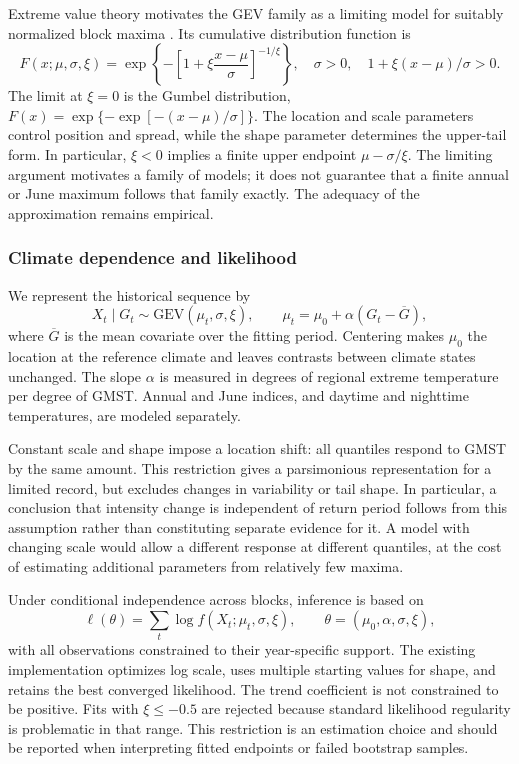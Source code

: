 \documentclass[11pt]{article}
\begin{document}
Extreme value theory motivates the GEV family as a limiting model for
suitably normalized block maxima
\cite{coles2001introduction,davison2015statistics}. Its
cumulative distribution function is
\begin{equation}
F(x;\mu,\sigma,\xi)=
\exp\left\{-\left[1+\xi\frac{x-\mu}{\sigma}\right]^{-1/\xi}\right\},
\quad \sigma>0,\quad 1+\xi(x-\mu)/\sigma>0.
\label{eq:gev}
\end{equation}
The limit at $\xi=0$ is the Gumbel distribution,
$F(x)=\exp\{-\exp[-(x-\mu)/\sigma]\}$. The location and scale parameters
control position and spread, while the shape parameter determines the
upper-tail form. In particular, $\xi<0$ implies a finite upper endpoint
$\mu-\sigma/\xi$. The limiting argument motivates a family of models;
it does not guarantee that a finite annual or June maximum follows that
family exactly. The adequacy of the approximation remains empirical.

\subsubsection{Climate dependence and likelihood}
We represent the historical sequence by
\begin{equation}
X_t\mid G_t\sim\mathrm{GEV}(\mu_t,\sigma,\xi),\qquad
\mu_t=\mu_0+\alpha(G_t-\overline G),
\label{eq:model}
\end{equation}
where $\overline G$ is the mean covariate over the fitting period.
Centering makes $\mu_0$ the location at the reference climate and leaves
contrasts between climate states unchanged. The slope $\alpha$ is
measured in degrees of regional extreme temperature per degree of GMST.
Annual and June indices, and daytime and nighttime temperatures, are
modeled separately.

Constant scale and shape impose a location shift: all quantiles respond
to GMST by the same amount. This restriction gives a parsimonious
representation for a limited record, but excludes changes in variability
or tail shape. In particular, a conclusion that intensity change is
independent of return period follows from this assumption rather than
constituting separate evidence for it. A model with changing scale would
allow a different response at different quantiles, at the cost of
estimating additional parameters from relatively few maxima.

Under conditional independence across blocks, inference is based on
\begin{equation}
\ell(\theta)=\sum_t\log f(X_t;\mu_t,\sigma,\xi),
\qquad \theta=(\mu_0,\alpha,\sigma,\xi),
\label{eq:likelihood}
\end{equation}
with all observations constrained to their year-specific support. The
existing implementation optimizes log scale, uses multiple starting
values for shape, and retains the best converged likelihood. The trend
coefficient is not constrained to be positive. Fits with $\xi\leq-0.5$
are rejected because standard likelihood regularity is problematic in
that range. This restriction is an estimation choice and should be
reported when interpreting fitted endpoints or failed bootstrap samples.
\end{document}
